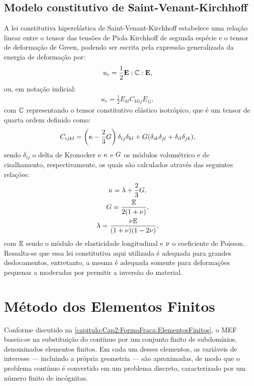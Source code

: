 \subsection{Modelo constitutivo de Saint-Venant-Kirchhoff}

A lei constitutiva hiperelástica de Saint-Venant-Kirchhoff estabelece uma relação linear entre o tensor das tensões de Piola Kirchhoff de segunda espécie e o tensor de deformação de Green, podendo ser escrita pela expressão generalizada da energia de deformação por:
\begin{align}
	u_{e} = \frac{1}{2} \mathbf{E} : \mathbb{C} : \mathbf{E},
\end{align}
\noindent ou, em notação indicial:
\begin{align}
	u_{e} = \frac{1}{2} E_{kl} C_{klij} E_{ij},
\end{align}
\noindent com $\mathbb{C}$ representando o tensor constitutivo elástico isotrópico, que é um tensor de quarta ordem definido como:
\begin{gather}
	C_{ijkl}=\left(\kappa - \frac{2}{3}G \right)\delta_{ij}\delta_{kl} + G(\delta_{ik}\delta_{jl}+\delta_{il}\delta_{jk}),
\end{gather}
\noindent sendo $\delta_{ij}$ o delta de Kronocker e $\kappa$ e $G$ os módulos volumétrico e de cisalhamento, respectivamente, os quais são calculados através das seguintes relações:
\begin{gather}
	\kappa=\lambda+\frac{2}{3}G,\\
	G=\frac{\mathbb{E}}{2(1+\nu)},\\
	\lambda=\frac{\nu \mathbb{E}}{(1+\nu)(1-2\nu)},
\end{gather}
\noindent com $\mathbb{E}$ sendo o módulo de elasticidade longitudinal e $\nu$ o coeficiente de Poisson. Ressalta-se que essa lei constitutiva aqui utilizada é adequada para grandes deslocamentos, entretanto, a mesma é adequada somente para deformações pequenas a moderadas por permitir a inversão do material.

\section{Método dos Elementos Finitos}

Conforme discutido na \autoref{capitulo:Cap2:FormaFraca:ElementosFinitos}, o MEF baseia-se na substituição do contínuo por um conjunto finito de subdomínios, denominados elementos finitos. Em cada um desses elementos, as variáveis de interesse — incluindo a própria geometria — são aproximadas, de modo que o problema contínuo é convertido em um problema discreto, caracterizado por um número finito de incógnitas.

